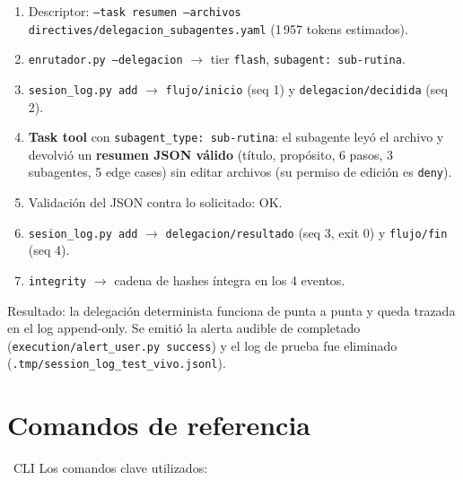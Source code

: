 \documentclass[11pt,a4paper]{article}
\newcommand{\iconotexto}[2]{\textcolor{cyanNeon}{\faIcon{#1}}~#2}
\begin{document}
\begin{enumerate}[leftmargin=20pt, itemsep=3pt, topsep=2pt]
  \item Descriptor: \texttt{--task resumen --archivos
        directives/delegacion\_subagentes.yaml} (1\,957 tokens estimados).
  \item \texttt{enrutador.py --delegacion} $\rightarrow$ tier \texttt{flash},
        \texttt{subagent: sub-rutina}.
  \item \texttt{sesion\_log.py add} $\rightarrow$ \texttt{flujo/inicio} (seq 1) y
        \texttt{delegacion/decidida} (seq 2).
  \item \textbf{Task tool} con \texttt{subagent\_type: sub-rutina}: el subagente leyó el
        archivo y devolvió un \textbf{resumen JSON válido} (título, propósito, 6 pasos,
        3 subagentes, 5 edge cases) sin editar archivos (su permiso de edición es
        \texttt{deny}).
  \item Validación del JSON contra lo solicitado: OK.
  \item \texttt{sesion\_log.py add} $\rightarrow$ \texttt{delegacion/resultado} (seq 3,
        exit 0) y \texttt{flujo/fin} (seq 4).
  \item \texttt{integrity} $\rightarrow$ cadena de hashes íntegra en los 4 eventos.
\end{enumerate}

\begin{tcolorbox}[cajaFortaleza]
Resultado: la delegación determinista funciona de punta a punta y queda trazada en el
log append-only. Se emitió la alerta audible de completado
(\texttt{execution/alert\_user.py success}) y el log de prueba fue eliminado
(\texttt{.tmp/session\_log\_test\_vivo.jsonl}).
\end{tcolorbox}

\section{Comandos de referencia}

\iconotexto{terminal}{CLI} Los comandos clave utilizados:
\end{document}
